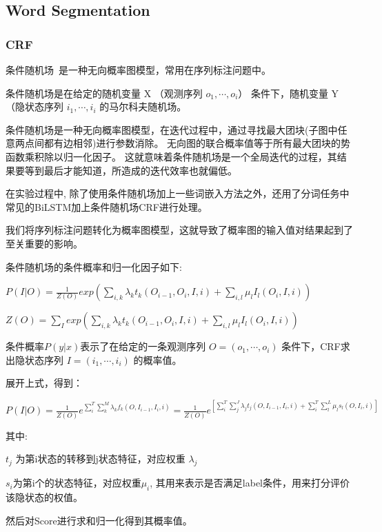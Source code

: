 \subsection{Word Segmentation}
\label{sec:cws}

\subsubsection{CRF}
\label{sec:crf}

条件随机场~\cite{lafferty2001conditional}是一种无向概率图模型，常用在序列标注问题中。

条件随机场是在给定的随机变量 X （观测序列 $o_{1}, \cdots, o_{i}$） 条件下，随机变量 Y （隐状态序列 $i_{1}, \cdots, i_{i}$ 的马尔科夫随机场。

条件随机场是一种无向概率图模型，在迭代过程中，通过寻找最大团块(子图中任意两点间都有边相邻)进行参数消除。
无向图的联合概率值等于所有最大团块的势函数乘积除以归一化因子。
这就意味着条件随机场是一个全局迭代的过程，其结果要等到最后才能知道，所造成的迭代效率也就偏低。

在实验过程中, 除了使用条件随机场加上一些词嵌入方法之外，还用了分词任务中常见的BiLSTM加上条件随机场CRF进行处理。

我们将序列标注问题转化为概率图模型，这就导致了概率图的输入值对结果起到了至关重要的影响。

条件随机场的条件概率和归一化因子如下:

$P(I|O) = \frac{1}{Z(O)}exp( \sum_{i,k}^{}{\lambda_{k}}t_{k}(O_{i-1},O_{i},I,i)+\sum_{i,l}^{}{\mu_{l}}I_{l}(O_{i},I,i) )$

$Z(O)= \sum_{I}^{}{exp( \sum_{i,k}^{}{\lambda_{k}}t_{k}(O_{i-1},O_{i},I,i)+\sum_{i,l}^{}{\mu_{l}}I_{l}(O_{i},I,i) )}$

条件概率$P(y|x)$表示了在给定的一条观测序列 $O=(o_{1},\cdots, o_{i})$ 条件下，CRF求出隐状态序列 $I=(i_{1},\cdots, i_{i})$ 的概率值。

展开上式，得到：

$P(I | O)=\frac{1}{Z(O)} e^{\sum_{i}^{T}\sum_{k}^{M}\lambda_{k}f_{k}(O,I_{i-1},I_{i},i)}=\frac{1}{Z(O)} e^{ [ \sum_{i}^{T}\sum_{j}^{J}\lambda_{j}t_{j}(O,I_{i-1},I_{i},i) + \sum_{i}^{T}\sum_{l}^{L}\mu_{l}s_{l}(O,I_{i},i) ] }$


其中:

$t_{j}$ 为第i状态的转移到j状态特征，对应权重 $\lambda_{j}$

$s_i$为第i个的状态特征，对应权重$μ_i$, 其用来表示是否满足label条件，用来打分评价该隐状态的权值。

然后对Score进行求和归一化得到其概率值。

